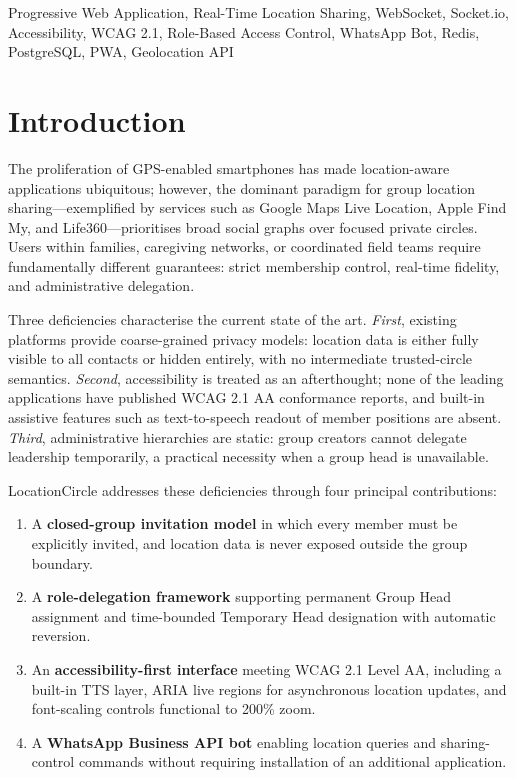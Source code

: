 \documentclass[conference]{IEEEtran}
\begin{document}
\begin{IEEEkeywords}
Progressive Web Application, Real-Time Location Sharing, WebSocket,
Socket.io, Accessibility, WCAG 2.1, Role-Based Access Control,
WhatsApp Bot, Redis, PostgreSQL, PWA, Geolocation API
\end{IEEEkeywords}

\section{Introduction}

The proliferation of GPS-enabled smartphones has made location-aware
applications ubiquitous; however, the dominant paradigm for group
location sharing—exemplified by services such as Google Maps Live
Location, Apple Find My, and Life360—prioritises broad social graphs
over focused private circles. Users within families, caregiving
networks, or coordinated field teams require fundamentally different
guarantees: strict membership control, real-time fidelity, and
administrative delegation.

Three deficiencies characterise the current state of the art.
\emph{First}, existing platforms provide coarse-grained privacy
models: location data is either fully visible to all contacts or
hidden entirely, with no intermediate trusted-circle semantics.
\emph{Second}, accessibility is treated as an afterthought; none of
the leading applications have published WCAG 2.1 AA conformance
reports, and built-in assistive features such as text-to-speech
readout of member positions are absent. \emph{Third}, administrative
hierarchies are static: group creators cannot delegate leadership
temporarily, a practical necessity when a group head is unavailable.

LocationCircle addresses these deficiencies through four principal
contributions:
\begin{enumerate}
  \item A \textbf{closed-group invitation model} in which every
        member must be explicitly invited, and location data is never
        exposed outside the group boundary.
  \item A \textbf{role-delegation framework} supporting permanent
        Group Head assignment and time-bounded Temporary Head
        designation with automatic reversion.
  \item An \textbf{accessibility-first interface} meeting WCAG 2.1
        Level AA, including a built-in TTS layer, ARIA live regions
        for asynchronous location updates, and font-scaling controls
        functional to 200\% zoom.
  \item A \textbf{WhatsApp Business API bot} enabling location
        queries and sharing-control commands without requiring
        installation of an additional application.
\end{enumerate}
\end{document}
